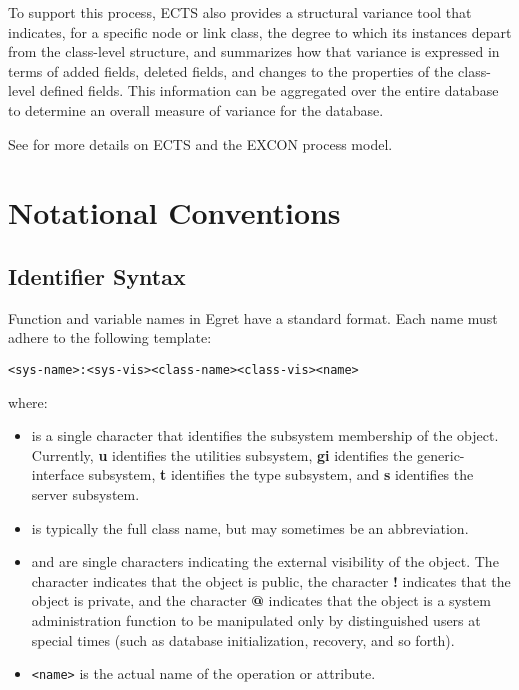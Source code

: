 To support this process, ECTS also provides a structural variance tool
that indicates, for a specific node or link class, the degree to which
its instances depart from the class-level structure, and summarizes
how that variance is expressed in terms of added fields, deleted
fields, and changes to the properties of the class-level defined
fields.  This information can be aggregated over the entire database
to determine an overall measure of variance for the database.

See \cite{csdl-92-01} for more details on ECTS and the EXCON process
model.

\section{Notational Conventions}
\label{conventions}

\subsection{Identifier Syntax}

Function and variable names in Egret have a standard format.
Each name must adhere to the following template:

\small\begin{verbatim}
<sys-name>:<sys-vis><class-name><class-vis><name>
\end{verbatim}\normalsize

\noindent where:
\begin{itemize}
  
\item {\tt <sys-name>} is a single character that identifies the
  subsystem membership of the object.  Currently, {\bf u} identifies
  the utilities subsystem, {\bf gi} identifies the generic-interface
  subsystem, {\bf t} identifies the type subsystem, and {\bf s}
  identifies the server subsystem.
  
\item {\tt <class-name>} is typically the full class name, but may
sometimes be an abbreviation.
  
\item {\tt <sys-vis>} and {\tt <class-vis>} are single characters
  indicating the external visibility of the object. The character
  {\bf *} indicates that the object is public, the character {\bf !}
  indicates that the object is private, and the character {\bf @}
  indicates that the object is a system administration function to be
  manipulated only by distinguished users at special times (such as
  database initialization, recovery, and so forth).  

  \item {\tt <name>} is the actual name of the operation or
  attribute.

\end{itemize}

